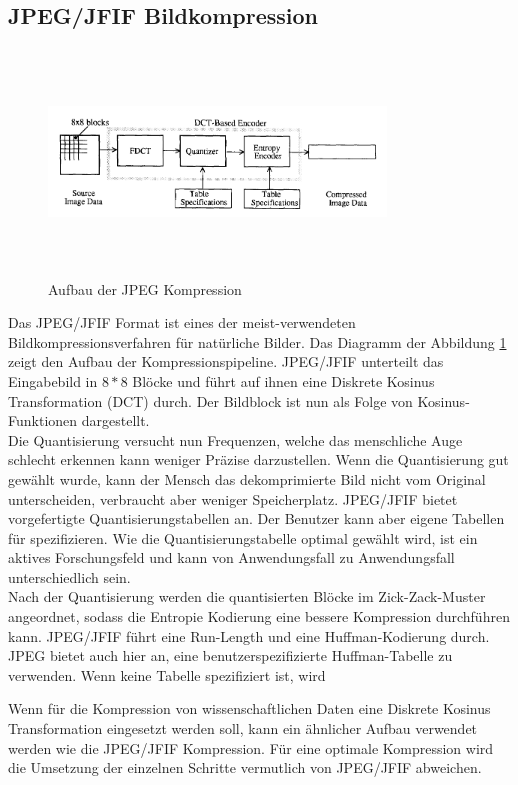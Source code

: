 \subsection{JPEG/JFIF Bildkompression}
\begin{figure}[!htbp]
	\center
	\includegraphics[width=0.8\textwidth,height=6cm,keepaspectratio]{./pictures/state/jpeg.png}
	\caption{Aufbau der JPEG Kompression \cite{wallace1992jpeg}}
	\label{state:jpeg:abb}
\end{figure}
Das JPEG/JFIF Format ist eines der meist-verwendeten Bildkompressionsverfahren für natürliche Bilder. Das Diagramm der Abbildung \ref{state:jpeg:abb} zeigt den Aufbau der Kompressionspipeline. JPEG/JFIF unterteilt das Eingabebild in $8*8$ Blöcke und führt auf ihnen eine Diskrete Kosinus Transformation (DCT) durch. Der Bildblock ist nun als Folge von Kosinus-Funktionen dargestellt.\\
Die Quantisierung versucht nun Frequenzen, welche das menschliche Auge schlecht erkennen kann weniger Präzise darzustellen. Wenn die Quantisierung gut gewählt wurde, kann der Mensch das dekomprimierte Bild nicht vom Original unterscheiden, verbraucht aber weniger Speicherplatz. JPEG/JFIF bietet vorgefertigte Quantisierungstabellen an. Der Benutzer kann aber eigene Tabellen für spezifizieren. Wie die Quantisierungstabelle optimal gewählt wird, ist ein aktives Forschungsfeld \cite{wu1993rate:jpeg} \cite{wang2001designing:jpeg} und kann von Anwendungsfall zu Anwendungsfall unterschiedlich sein.\\
Nach der Quantisierung werden die quantisierten Blöcke im Zick-Zack-Muster angeordnet, sodass die Entropie Kodierung eine bessere Kompression durchführen kann. JPEG/JFIF führt eine Run-Length und eine Huffman-Kodierung durch. JPEG bietet auch hier an, eine benutzerspezifizierte Huffman-Tabelle zu verwenden. Wenn keine Tabelle spezifiziert ist, wird 

Wenn für die Kompression von wissenschaftlichen Daten eine Diskrete Kosinus Transformation eingesetzt werden soll, kann ein ähnlicher Aufbau verwendet werden wie die JPEG/JFIF Kompression. Für eine optimale Kompression wird die Umsetzung der einzelnen Schritte vermutlich von JPEG/JFIF abweichen.

